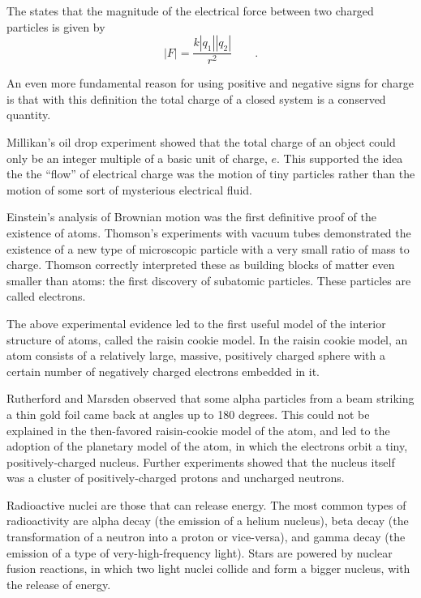	The  states that the magnitude of the
	electrical force between two charged particles is given by
	\begin{equation*}
		|F| = \frac{k|q_1||q_2|}{r^2} \qquad .
	\end{equation*}
	
	 An even more fundamental reason for
	using positive and negative signs for charge is that with
	this definition the total charge of a closed system is
	a conserved quantity.
	
	 Millikan's oil drop experiment
	showed that the total charge of an object could only be an
	integer multiple of a basic unit of charge, $e$. This
	supported the idea the the ``flow'' of electrical charge was
	the motion of tiny particles rather than the motion of some
	sort of mysterious electrical fluid.
	
	Einstein's analysis of Brownian motion was the first
	definitive proof of the existence of atoms. Thomson's
	experiments with vacuum tubes demonstrated the existence of
	a new type of microscopic particle with a very small ratio
	of mass to charge. Thomson correctly interpreted these as
	building blocks of matter even smaller than atoms: the first
	discovery of subatomic particles. These particles are called electrons.
	
	The above experimental evidence led to the first useful
	model of the interior structure of atoms, called the raisin
	 cookie model. In the raisin  cookie model, an atom
	consists of a relatively large, massive, positively charged
	sphere with a certain number of negatively charged
	electrons embedded in it.
	
	Rutherford and Marsden observed that some alpha particles
	from a beam striking a thin gold foil came back at angles up
	to 180 degrees. This could not be explained in the
	then-favored raisin-cookie model of the atom, and led to
	the adoption of the planetary model of the atom, in which
	the electrons orbit a tiny, positively-charged nucleus.
	Further experiments showed that the nucleus itself was a
	cluster of positively-charged protons and uncharged neutrons.
	
	Radioactive nuclei are those that can release energy. The
	most common types of radioactivity are alpha decay (the
	emission of a helium nucleus), beta decay (the transformation
	of a neutron into a proton or vice-versa), and gamma decay
	(the emission of a type of very-high-frequency light). Stars
	are powered by nuclear fusion reactions, in which two light
	nuclei collide and form a bigger nucleus, with the release of energy.
	
